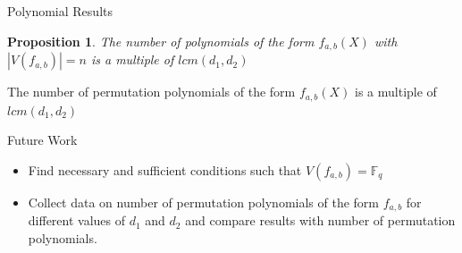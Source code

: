 \documentclass{beamer}
\newtheorem{proposition}{Proposition}
\begin{document}
\begin{frame}{Polynomial Results}
    \begin{proposition}
    The number of polynomials of the form $f_{a, b}(X)$ with $|V(f_{a, b})| = n$ is a multiple of $lcm(d_1, d_2)$
  \end{proposition}

  \begin{corollary}
    The number of permutation polynomials of the form $f_{a, b}(X)$ is a multiple of $lcm(d_1, d_2)$
  \end{corollary}
\end{frame}

\begin{frame}{Future Work}
  \begin{itemize}
    \item Find necessary and sufficient conditions such that $V(f_{a,b}) = \mathbb{F}_q$
    \item Collect data on number of permutation polynomials of the form $f_{a,b}$ for different values of $d_1$ and $d_2$ and compare results with number of permutation polynomials.
  \end{itemize}
\end{frame}

\end{document}
